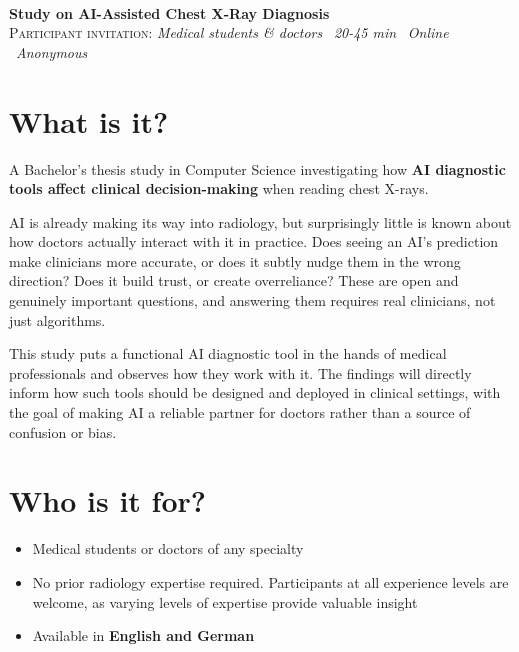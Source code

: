 \documentclass[10pt,a4paper]{article}
\begin{document}
\thispagestyle{empty}

\noindent{\color{accent}\rule{\linewidth}{2.5pt}}\\[0.45em]
{\LARGE\bfseries\color{accent}Study on AI-Assisted Chest X-Ray Diagnosis}\\[0.35em]
{\footnotesize\color{textmuted}\textsc{Participant invitation}: 
\textit{Medical students \& doctors} \textbullet\ 
\textit{20-45 min} \textbullet\ 
\textit{Online} \textbullet\ 
\textit{Anonymous}}

\vspace{0.85em}

\section{What is it?}

A Bachelor's thesis study in Computer Science investigating how \textbf{AI diagnostic tools affect clinical decision-making} when reading chest X-rays.

AI is already making its way into radiology, but surprisingly little is known about how doctors actually interact with it in practice. Does seeing an AI's prediction make clinicians more accurate, or does it subtly nudge them in the wrong direction? Does it build trust, or create overreliance? These are open and genuinely important questions, and answering them requires real clinicians, not just algorithms.

This study puts a functional AI diagnostic tool in the hands of medical professionals and observes how they work with it. The findings will directly inform how such tools should be designed and deployed in clinical settings, with the goal of making AI a reliable partner for doctors rather than a source of confusion or bias.

\section{Who is it for?}

\begin{itemize}
  \item Medical students or doctors of any specialty
  \item No prior radiology expertise required. Participants at all experience levels are welcome, as varying levels of expertise provide valuable insight
  \item Available in \textbf{English and German}
\end{itemize}
\end{document}
